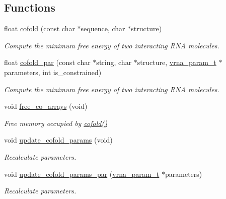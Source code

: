 \subsection*{Functions}
\begin{DoxyCompactItemize}
\item 
float \hyperlink{group__mfe__global__deprecated_gabc8517f22cfe70595ee81fc837910d52}{cofold} (const char $\ast$sequence, char $\ast$structure)
\begin{DoxyCompactList}\small\item\em Compute the minimum free energy of two interacting R\+NA molecules. \end{DoxyCompactList}\item 
float \hyperlink{group__mfe__global__deprecated_ga7612cfeeb1b793f1e4179b1eb53df1f3}{cofold\+\_\+par} (const char $\ast$string, char $\ast$structure, \hyperlink{group__energy__parameters_ga8a69ca7d787e4fd6079914f5343a1f35}{vrna\+\_\+param\+\_\+t} $\ast$parameters, int is\+\_\+constrained)
\begin{DoxyCompactList}\small\item\em Compute the minimum free energy of two interacting R\+NA molecules. \end{DoxyCompactList}\item 
void \hyperlink{group__mfe__global__deprecated_gaafb33d7473eb9af9d1b168ca8761c41a}{free\+\_\+co\+\_\+arrays} (void)
\begin{DoxyCompactList}\small\item\em Free memory occupied by \hyperlink{group__mfe__global__deprecated_gabc8517f22cfe70595ee81fc837910d52}{cofold()} \end{DoxyCompactList}\item 
void \hyperlink{group__mfe__global__deprecated_ga4fcbf34e77b99bfbb2333d2ab0c41a57}{update\+\_\+cofold\+\_\+params} (void)
\begin{DoxyCompactList}\small\item\em Recalculate parameters. \end{DoxyCompactList}\item 
void \hyperlink{group__mfe__global__deprecated_gaaadbd28b4e428710529ab4098fdacad3}{update\+\_\+cofold\+\_\+params\+\_\+par} (\hyperlink{group__energy__parameters_ga8a69ca7d787e4fd6079914f5343a1f35}{vrna\+\_\+param\+\_\+t} $\ast$parameters)
\begin{DoxyCompactList}\small\item\em Recalculate parameters. \end{DoxyCompactList}\item 

\end{DoxyCompactItemize}

